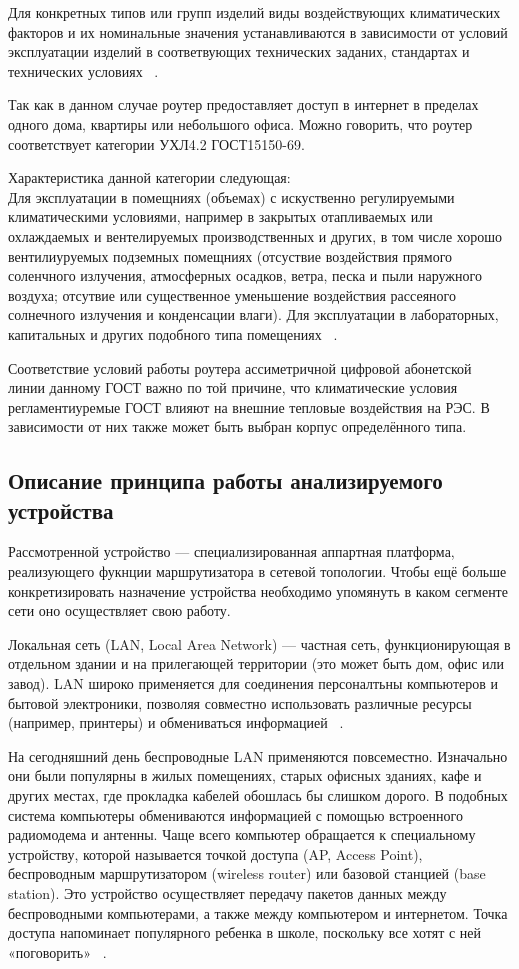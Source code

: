 Для конкретных типов или групп изделий виды воздействующих
климатических факторов и их номинальные значения устанавливаются в
зависимости от условий эксплуатации изделий в соответвующих
технических заданих, стандартах и технических условиях ~\cite{GOST_15150-69}.

Так как в данном случае роутер предоставляет доступ в интернет в
пределах одного дома, квартиры или небольшого офиса. Можно говорить, что роутер соответствует категории УХЛ4.2 ГОСТ15150-69.

Характеристика данной категории следующая:\\
Для эксплуатации в помещниях (объемах) с искуственно регулируемыми
климатическими условиями, например в закрытых отапливаемых или
охлаждаемых и вентелируемых производственных и других, в том числе
хорошо вентилиуруемых подземных помещниях (отсуствие воздействия
прямого соленчного излучения, атмосферных осадков, ветра, песка и пыли
наружного воздуха; отсутвие или существенное уменьшение воздействия
рассеяного солнечного излучения и конденсации влаги). Для эксплуатации
в лабораторных, капитальных и других подобного типа помещениях ~\cite{GOST_15150-69}.

Соответствие условий работы роутера ассиметричной цифровой абонетской
линии данному ГОСТ важно по той причине, что климатические условия
регламентиуремые ГОСТ влияют на внешние тепловые воздействия на РЭС.
В зависимости от них также может быть выбран корпус определённого
типа.

\subsection{Описание принципа работы анализируемого устройства}


Рассмотренной устройство — специализированная аппартная платформа,
реализующего фукнции маршрутизатора в сетевой топологии.  Чтобы ещё
больше конкретизировать назначение устройства необходимо упомянуть в
каком сегменте сети оно осуществляет свою работу.


Локальная сеть (LAN, Local Area Network) — частная сеть,
функционирующая в отдельном здании и на прилегающей территории
(это может быть дом, офис или завод). LAN широко применяется для соединения персоналтьны компьютеров и бытовой электроники, позволяя совместно
использовать различные ресурсы (например, принтеры) и обмениваться
информацией ~\cite{NetworksTanenbaum2023}.

На сегодняшний день беспроводные LAN применяются
повсеместно. Изначально они были популярны в жилых помещениях, старых
офисных зданиях, кафе и других местах, где прокладка кабелей обошлась
бы слишком дорого. В подобных система компьютеры обмениваются
информацией с помощью встроенного радиомодема и антенны. Чаще всего
компьютер обращается к специальному устройству, которой называется
точкой доступа (AP, Access Point), беспроводным маршрутизатором
(wireless router) или базовой станцией (base station). Это устройство
осуществляет передачу пакетов данных между беспроводными компьютерами,
а также между компьютером и интернетом. Точка доступа напоминает
популярного ребенка в школе, поскольку все хотят с ней «поговорить»
~\cite{NetworksTanenbaum2023}.

